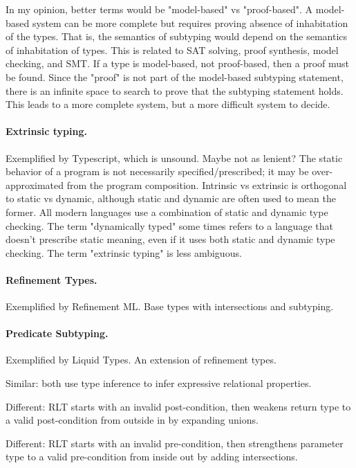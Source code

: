 \documentclass[acmsmall]{acmart}
\begin{document}
In my opinion, better terms would be "model-based" vs "proof-based".
A model-based system can be more complete but requires proving absence of inhabitation of the types.
That is, the semantics of subtyping would depend on the semantics of inhabitation of types.
This is related to SAT solving, proof synthesis, model checking, and SMT.
If a type is model-based, not proof-based, then a proof must be found.
Since the "proof" is not part of the model-based subtyping statement, 
there is an infinite space to search to prove that the subtyping statement holds.
This leads to a more complete system, but a more difficult system to decide.

\paragraph{Extrinsic typing.}
Exemplified by Typescript, which is unsound. Maybe not as lenient?  
The static behavior of a program is not necessarily specified/prescribed; 
it may be over-approximated from the program composition. 
Intrinsic vs extrinsic is orthogonal to static vs dynamic, although static and dynamic are often used to mean the former.
All modern languages use a combination of static and dynamic type checking.
The term "dynamically typed" some times refers to a language that doesn't prescribe static meaning,
even if it uses both static and dynamic type checking. The term "extrinsic typing" is less ambiguous.

\paragraph{Refinement Types.}
Exemplified by Refinement ML. Base types with intersections and subtyping.

\paragraph{Predicate Subtyping.}
Exemplified by Liquid Types. An extension of refinement types.

Similar: both use type inference to infer expressive relational properties. 

Different: RLT starts with an invalid post-condition, then weakens return type to a valid post-condition from outside in by expanding unions.

Different: RLT starts with an invalid pre-condition, then strengthens parameter type to a valid pre-condition from inside out by adding intersections.
\end{document}
